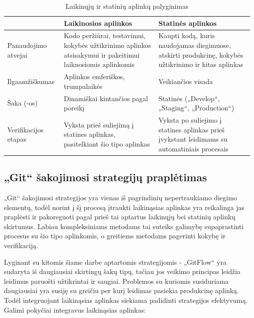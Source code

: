 \documentclass{VUMIFPSkursinis}
\begin{document}
\begin{table}[H]\footnotesize
  \centering
  \caption{Laikinųjų ir statinių aplinkų palyginimas}
  {\begin{tabular}{|l|p{55mm}|p{55mm}|} \hline
     & Laikinosios aplinkos & Statinės aplinkos \\
    \hline
    Panaudojimo atvejai & Kodo peržiūrai, testavimui, kokybės užtikrinimo aplinkos atsisakymui ir pakeitimui laiknosiomis aplinkomis & Kaupti kodą, kuris naudojamas diegimuose, atskirti produkcinę, kokybės užtikrinimo ir kitas aplinkas     \\
    \hline
    Ilgaamžiškumas & Aplinkos emferiškos, trumpalaikės & Veikiančios visada       \\
    \hline
    Šaka (-os) & Dinamiškai kintančios pagal poreikį & Statinės \newline („Develop“, „Staging“, „Production“) \\
    \hline
    Verifikacijos etapas  & Vyksta prieš suliejimą į statines aplinkas, pasitelkiant šio tipo aplinkas & Vyksta po suliejimo į statines aplinkas prieš įvykstant leidimams su automatiniais procesais \\
    \hline
  \end{tabular}}
  \label{tab:table example}
\end{table}

\subsection{„Git“ šakojimosi strategijų praplėtimas}

„Git“ šakojimosi strategijos yra vienas iš pagrindinių nepertraukiamo diegimo elementų, todėl norint į šį procesą įtraukti laikinąsias aplinkas yra reikalinga jas praplėsti ir pakoreguoti pagal prieš tai aptartus laikinųjų bei statinių aplinkų skirtumus. Labiau kompleksiniams metodams tai suteiks galimybę supaprastinti procesus su šio tipo aplinkomis, o greitiems metodams pagerinti kokybę ir verifikaciją. 

Lyginant su kitomis šiame darbe aptartomis strategijomis - „GitFlow“ yra sudaryta iš daugiausiai skirtingų šakų tipų, tačiau jos veikimo principas leidžia leidimus paruošti užtikrintai ir saugiai. Problemos su kuriomis susiduriama daugiausiai yra susiję su greičiu per kurį leidimas pasiekia produkcinę aplinką. Todėl integruojant laikinąsias aplinkas siekiama padidinti strategijos efektyvumą. Galimi pokyčiai integravus laikinąsias aplinkas: 
\end{document}
